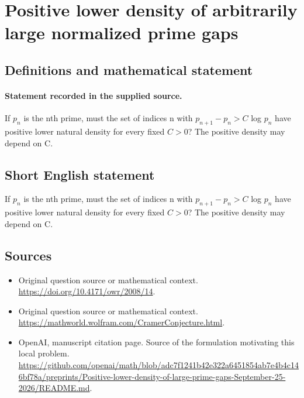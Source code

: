 \documentclass[11pt]{article}
\begin{document}
\section*{Positive lower density of arbitrarily large normalized prime gaps}\label{30007273}
\subsection{Definitions and mathematical statement}
\paragraph{Statement recorded in the supplied source.}
If $p_n$ is the nth prime, must the set of indices n with $p_{n+1}-p_n>C$ log $p_n$ have positive lower natural density for every fixed $C>0$? The positive density may depend on C.
\subsection{Short English statement}
If $p_n$ is the nth prime, must the set of indices n with $p_{n+1}-p_n>C$ log $p_n$ have positive lower natural density for every fixed $C>0$? The positive density may depend on C.
\subsection{Sources}
\begin{itemize}
\item[S1] Original question source or mathematical context.
\url{https://doi.org/10.4171/owr/2008/14}.
\item[S2] Original question source or mathematical context.
\url{https://mathworld.wolfram.com/CramerConjecture.html}.
\item[S3] OpenAI, manuscript citation page. Source of the formulation motivating this local problem.
\url{https://github.com/openai/math/blob/adc7f1241b42e322a6451854ab7e4b4c146bf78a/preprints/Positive-lower-density-of-large-prime-gaps-September-25-2026/README.md}.
\end{itemize}
\end{document}
